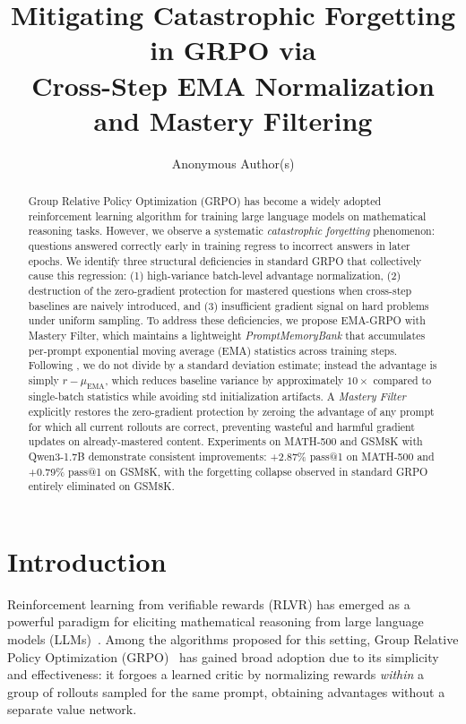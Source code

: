 \documentclass[11pt]{article}
\title{\textbf{Mitigating Catastrophic Forgetting in GRPO via\\
       Cross-Step EMA Normalization and Mastery Filtering}}
\author{
  Anonymous Author(s)
}
\date{}
\newcommand{\methodfull}{EMA-GRPO with Mastery Filter}
\theoremstyle{definition}
\begin{document}
\maketitle

\begin{abstract}
Group Relative Policy Optimization (GRPO) has become a widely adopted
reinforcement learning algorithm for training large language models on
mathematical reasoning tasks.
However, we observe a systematic \emph{catastrophic forgetting} phenomenon:
questions answered correctly early in training regress to incorrect answers
in later epochs.
We identify three structural deficiencies in standard GRPO that collectively
cause this regression: (1) high-variance batch-level advantage normalization,
(2) destruction of the zero-gradient protection for mastered questions when
cross-step baselines are naively introduced, and (3) insufficient gradient
signal on hard problems under uniform sampling.
To address these deficiencies, we propose \methodfull{}, which maintains a
lightweight \emph{PromptMemoryBank} that accumulates per-prompt exponential
moving average (EMA) statistics across training steps.
Following \citet{liu2025drgrpo}, we do not divide by a standard deviation
estimate; instead the advantage is simply $r - \mu_{\mathrm{EMA}}$, which
reduces baseline variance by approximately $10\times$ compared to single-batch
statistics while avoiding std initialization artifacts.
A \emph{Mastery Filter} explicitly restores the zero-gradient protection by
zeroing the advantage of any prompt for which all current rollouts are correct,
preventing wasteful and harmful gradient updates on already-mastered content.
Experiments on MATH-500 and GSM8K with Qwen3-1.7B demonstrate consistent
improvements: +2.87\% pass@1 on MATH-500 and +0.79\% pass@1 on GSM8K,
with the forgetting collapse observed in standard GRPO entirely eliminated
on GSM8K.
\end{abstract}

\section{Introduction}
\label{sec:intro}

Reinforcement learning from verifiable rewards (RLVR) has emerged as a
powerful paradigm for eliciting mathematical reasoning from large language
models (LLMs)~\citep{ouyang2022training,lightman2023let}.
Among the algorithms proposed for this setting, Group Relative Policy
Optimization (GRPO)~\citep{shao2024deepseekmath} has gained broad adoption
due to its simplicity and effectiveness: it forgoes a learned critic by
normalizing rewards \emph{within} a group of rollouts sampled for the same
prompt, obtaining advantages without a separate value network.
\end{document}
